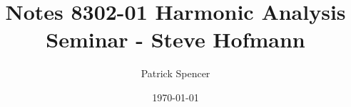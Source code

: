 \documentclass[12pt,makeidx]{amsbook}
\begin{document}
\title{Notes 8302-01 Harmonic Analysis Seminar - Steve Hofmann}
\author{Patrick Spencer}
\date{\today}
\maketitle

\tableofcontents

\newpage


\printindex



\end{document}
